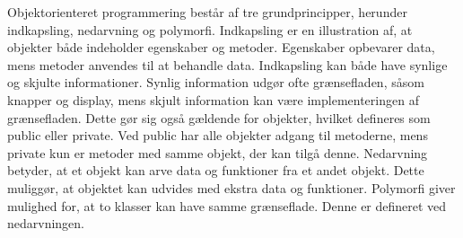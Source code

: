 \noindent
Objektorienteret programmering består af tre grundprincipper, herunder indkapsling, nedarvning og polymorfi. Indkapsling er en illustration af, at objekter både indeholder egenskaber og metoder. Egenskaber opbevarer data, mens metoder anvendes til at behandle data. Indkapsling kan både have synlige og skjulte informationer. Synlig information udgør ofte grænsefladen, såsom knapper og display, mens skjult information kan være implementeringen af grænsefladen. Dette gør sig også gældende for objekter, hvilket defineres som public eller private. Ved public har alle objekter adgang til metoderne, mens private kun er metoder med samme objekt, der kan tilgå denne. Nedarvning betyder, at et objekt kan arve data og funktioner fra et andet objekt. Dette muliggør, at objektet kan udvides med ekstra data og funktioner. Polymorfi giver mulighed for, at to klasser kan have samme grænseflade. Denne er defineret ved nedarvningen.\cite{Stefanov2013}
